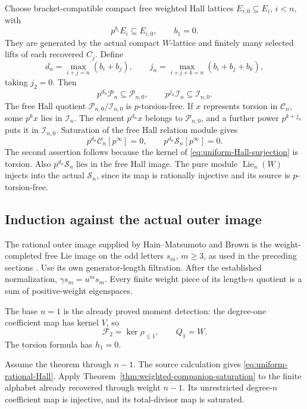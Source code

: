 \documentclass[11pt]{article}
\theoremstyle{definition}\newtheorem{definition}[theorem]{Definition}
\begin{document}
Choose bracket-compatible compact free weighted Hall lattices
\(E_{i,0}\subseteq E_i\), \(i<n\), with
\[
 p^{b_i}E_i\subseteq E_{i,0},\qquad b_1=0.
\]
They are generated by the actual compact \(W\)-lattice and
finitely many selected lifts of each recovered \(C_j\).
Define
\begin{equation}\label{eq:uniform-bounds}
 d_n=\max_{i+j=n}(b_i+b_j),\qquad
 j_n=\max_{i+j+k=n}(b_i+b_j+b_k),
\end{equation}
taking \(j_2=0\).  Then
\[
 p^{d_n}\mathcal P_n\subseteq\mathcal P_{n,0},\qquad
 p^{j_n}\mathcal I_n\subseteq\mathcal I_{n,0}.
\]
The free Hall quotient
\(\mathcal P_{n,0}/\mathcal I_{n,0}\) is
\(p\)-torsion-free.  If \(x\) represents torsion in
\(\mathcal C_n\), some \(p^kx\) lies in \(\mathcal I_n\).
The element \(p^{d_n}x\) belongs to \(\mathcal P_{n,0}\),
and a further power \(p^{k+j_n}\) puts it in
\(\mathcal I_{n,0}\).  Saturation of the free Hall relation
module gives
\begin{equation}\label{eq:uniform-S-torsion}
 p^{d_n}\mathcal C_n[p^\infty]=0,\qquad
 p^{d_n}\mathcal S_n[p^\infty]=0.
\end{equation}
The second assertion follows because the kernel of
\eqref{eq:uniform-Hall-surjection} is torsion.
Also \(p^{d_n}\mathcal S_n\) lies in the free Hall image.
The pure module \(\operatorname{Lie}_n(W)\) injects into
the actual \(\mathcal S_n\), since its map is rationally injective
and its source is \(p\)-torsion-free.

\subsection{Induction against the actual outer image}

The rational outer image supplied by Hain--Matsumoto and
Brown is the weight-completed free Lie image on the odd
letters \(s_m\), \(m\geq3\), as used in the preceding
sections \cite{HM,Brown}.  Use its own generator-length
filtration.  After the established normalization,
\(\gamma s_m=u^m s_m\).  Every finite weight piece of
its length-\(n\) quotient is a sum of positive-weight
eigenspaces.

The base \(n=1\) is the already proved moment detection:
the degree-one coefficient map has kernel \(V\), so
\[
 \mathcal F_2=\ker\rho_{\leq1},\qquad Q_1=W.
\]
The torsion formula has \(h_1=0\).

Assume the theorem through \(n-1\).
The source calculation gives
\eqref{eq:uniform-rational-Hall}.  Apply
Theorem~\ref{thm:weighted-companion-saturation} to the
finite alphabet already recovered through weight \(n-1\).
Its unrestricted degree-\(n\) coefficient map is injective,
and its total-divisor map is saturated.
\end{document}
